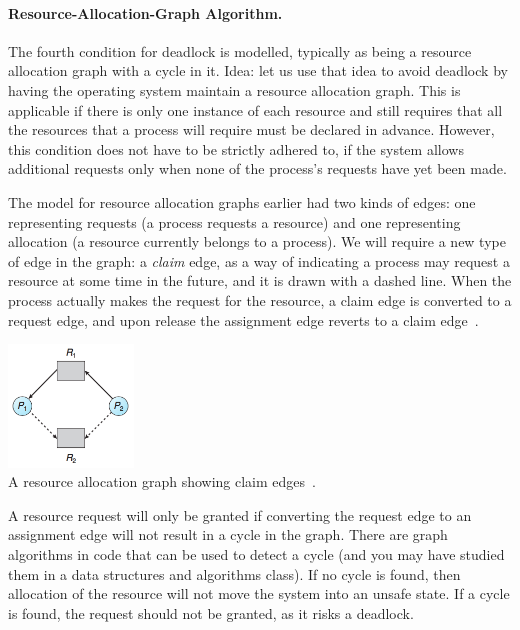 \paragraph{Resource-Allocation-Graph Algorithm.} The fourth condition for deadlock is modelled, typically as being a resource allocation graph with a cycle in it. Idea: let us use that idea to avoid deadlock by having the operating system maintain a resource allocation graph. This is applicable if there is only one instance of each resource and still requires that all the resources that a process will require must be declared in advance. However, this condition does not have to be strictly adhered to, if the system allows additional requests only when none of the process's requests have yet been made.

The model for resource allocation graphs earlier had two kinds of edges: one representing requests (a process requests a resource) and one representing allocation (a resource currently belongs to a process). We will require a new type of edge in the graph: a \textit{claim} edge, as a way of indicating a process may request a resource at some time in the future, and it is drawn with a dashed line. When the process actually makes the request for the resource, a claim edge is converted to a request edge, and upon release the assignment edge reverts to a claim edge~\cite{osc}.

\begin{center}
	\includegraphics[width=0.25\textwidth]{images/resource-allocation-graph-claim.png}\\
	A resource allocation graph showing claim edges~\cite{osc}.
\end{center}

A resource request will only be granted if converting the request edge to an assignment edge will not result in a cycle in the graph. There are graph algorithms in code that can be used to detect a cycle (and you may have studied them in a data structures and algorithms class). If no cycle is found, then allocation of the resource will not move the system into an unsafe state. If a cycle is found, the request should not be granted, as it risks a deadlock.

